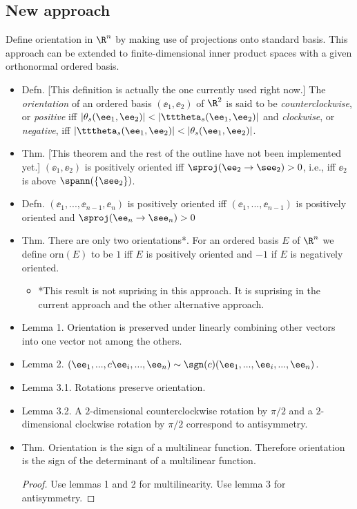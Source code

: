\subsection*{New approach}

Define orientation in $\R^n$ by making use of projections onto standard basis. This approach can be extended to finite-dimensional inner product spaces with a given orthonormal ordered basis.

\begin{itemize}
	\item Defn. [This definition is actually the one currently used right now.] The \textit{orientation} of an ordered basis $(\ee_1, \ee_2)$ of $\R^2$ is said to be \textit{counterclockwise}, or \textit{positive} iff $|\theta_s(\ee_1, \ee_2)| < |\tttheta_s(\ee_1, \ee_2)|$ and \textit{clockwise}, or \textit{negative}, iff $|\tttheta_s(\ee_1, \ee_2)| < |\theta_s(\ee_1, \ee_2)|$.
	\item Thm. [This theorem and the rest of the outline have not been implemented yet.] $(\ee_1, \ee_2)$ is positively oriented iff $\sproj(\ee_2 \rightarrow \see_2) > 0$, i.e., iff $\ee_2$ is above $\spann(\{\see_2\})$.
	\item Defn. $(\ee_1, ..., \ee_{n - 1}, \ee_n)$ is positively oriented iff $(\ee_1, ..., \ee_{n - 1})$ is positively oriented and $\sproj(\ee_n \rightarrow \see_n) > 0$
	\item Thm. There are only two orientations*. For an ordered basis $E$ of $\R^n$ we define $\text{orn}(E)$ to be $1$ iff $E$ is positively oriented and $-1$ if $E$ is negatively oriented.
	\begin{itemize}
		\item *This result is not suprising in this approach. It is suprising in the current approach and the other alternative approach.
	\end{itemize}
	\item Lemma 1. Orientation is preserved under linearly combining other vectors into one vector not among the others.
	\item Lemma 2. $(\ee_1, ..., c\ee_i, ..., \ee_n) \sim \sgn(c)(\ee_1, ..., \ee_i, ..., \ee_n)$.
	\item Lemma 3.1. Rotations preserve orientation.
	\item Lemma 3.2. A $2$-dimensional counterclockwise rotation by $\pi/2$ and a $2$-dimensional clockwise rotation by $\pi/2$ correspond to antisymmetry.
	\item Thm. Orientation is the sign of a multilinear function. Therefore orientation is the sign of the determinant of a multilinear function.
	\begin{proof}
		Use lemmas 1 and 2 for multilinearity. Use lemma 3 for antisymmetry. 
	\end{proof}
\end{itemize}

